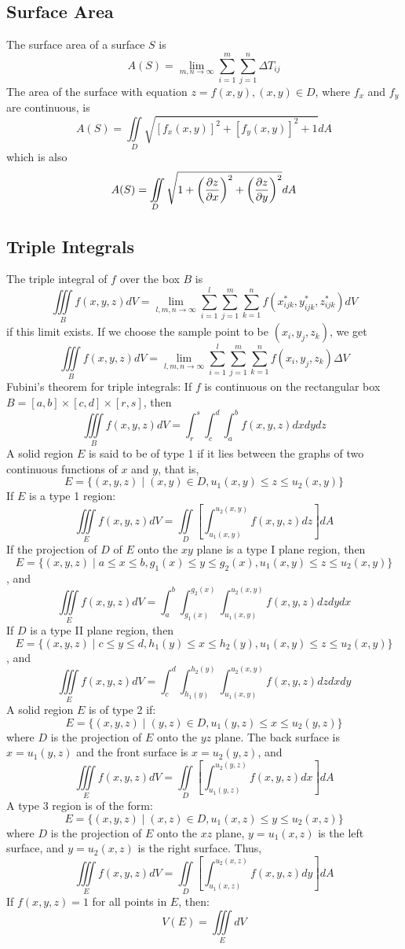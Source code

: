\documentclass{article}
\begin{document}
    \subsection{Surface Area}
    \begin{outline}
        \1 The surface area of a surface $S$ is \[A(S)=\lim_{m,n\to\infty}\sum^m_{i=1}\sum^n_{j=1}\Delta T_{ij}\]
        \1 The area of the surface with equation \(z=f(x,y),(x,y)\in D\), where \(f_x\) and \(f_y\) are continuous, is \[A(S)=\iint\limits_D\sqrt{[f_x(x,y)]^2+[f_y(x,y)]^2+1}dA\] which is also \[A(S)=\iint\limits_D\sqrt{1+\left(\pdv{z}{x}\right)^2+\left(\pdv{z}{y}\right)^2}dA\]

    \end{outline}
    \subsection{Triple Integrals}
    \begin{outline}
        \1 The triple integral of $f$ over the box $B$ is \[\iiint\limits_Bf(x,y,z)dV=\lim_{l,m,n\to\infty}\sum^l_{i=1}\sum^m_{j=1}\sum^n_{k=1}f(x^*_{ijk},y^*_{ijk},z^*_{ijk})dV\] if this limit exists. 
        \1 If we choose the sample point to be \((x_i,y_j,z_k)\), we get \[\iiint\limits_Bf(x,y,z)dV=\lim_{l,m,n\to\infty}\sum^l_{i=1}\sum^m_{j=1}\sum^n_{k=1}f(x_i,y_j,z_k)\Delta V\]
        \1 Fubini's theorem for triple integrals: If $f$ is continuous on the rectangular box \(B=[a,b]\times[c,d]\times[r,s]\),  then \[\iiint\limits_Bf(x,y,z)dV=\int^s_r\int^d_c\int^b_af(x,y,z)dxdydz\]
        \1 A solid region $E$ is said to be of type 1 if it lies between the graphs of two continuous functions of $x$ and $y$, that is, \[E=\{(x,y,z)\;|\;(x,y)\in D, u_1(x,y)\leq z\leq u_2(x,y)\}\]
        \1 If $E$ is a type 1 region: \[\iiint\limits_Ef(x,y,z)dV=\iint\limits_D\left[\int^{u_2(x,y)}_{u_1(x,y)}f(x,y,z)dz\right]dA\]
        \1 If the projection of $D$ of $E$ onto the $xy$ plane is a type I plane region, then \[E=\{(x,y,z)\;|\;a\leq x\leq b, g_1(x)\leq y\leq g_2(x), u_1(x,y)\leq z\leq u_2(x,y)\}\], and \[\iiint\limits_Ef(x,y,z)dV=\int^b_a\int^{g_2(x)}_{g_1(x)}\int^{u_2(x,y)}_{u_1(x,y)}f(x,y,z)dzdydx\]
        \1 If $D$ is a type II plane region, then \[E=\{(x,y,z)\;|\;c\leq y\leq d, h_1(y)\leq x \leq h_2(y),u_1(x,y)\leq z\leq u_2(x,y)\}\], and \[\iiint\limits_Ef(x,y,z)dV=\int_c^d\int_{h_1(y)}^{h_2(y)}\int_{u_1(x,y)}^{u_2(x,y)}f(x,y,z)dzdxdy\]
        \1 A solid region $E$ is of type 2 if: \[E=\{(x,y,z)\;|\;(y,z)\in D,u_1(y,z)\leq x\leq u_2(y,z)\}\] where $D$ is the projection of $E$ onto the $yz$ plane. The back surface is \(x=u_1(y,z)\) and the front surface is \(x=u_2(y,z)\), and \[\iiint\limits_Ef(x,y,z)dV=\iint\limits_D\left[\int_{u_1(y,z)}^{u_2(y,z)}f(x,y,z)dx\right]dA\]
        \1 A type 3 region is of the form: \[E=\{(x,y,z)\;|\;(x,z)\in D, u_1(x,z)\leq y\leq u_2(x,z)\}\] where $D$ is the projection of $E$ onto the $xz$ plane, \(y=u_1(x,z)\) is the left surface, and \(y=u_2(x,z)\) is the right surface. Thus, \[\iiint\limits_Ef(x,y,z)dV=\iint\limits_D\left[\int_{u_1(x,z)}^{u_2(x,z)}f(x,y,z)dy\right]dA\]
        \1 If \(f(x,y,z)=1\) for all points in $E$, then: \[V(E)=\iiint\limits_EdV\]
    \end{outline}
\end{document}
